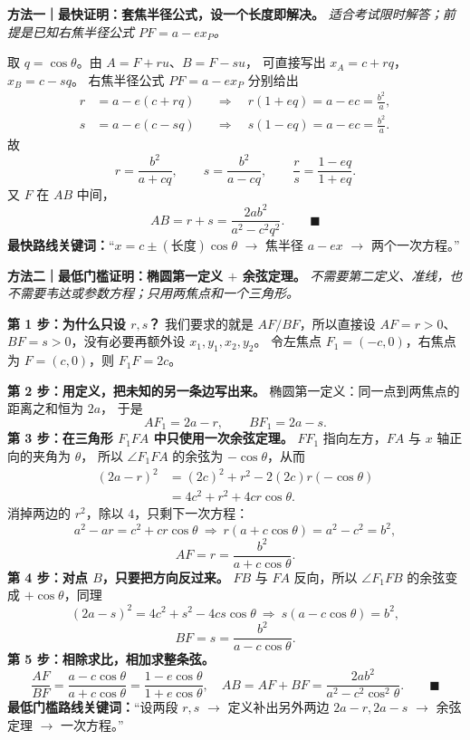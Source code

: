 \begin{proofbox}
\textbf{方法一｜最快证明：套焦半径公式，设一个长度即解决。}\quad
\emph{适合考试限时解答；前提是已知右焦半径公式 $PF=a-ex_P$。}
\par\smallskip\noindent
取 $q=\cos\theta$。由 $A=F+ru$、$B=F-su$，
可直接写出 $x_A=c+rq$，$x_B=c-sq$。
右焦半径公式 $PF=a-ex_P$ 分别给出
\[
 \begin{aligned}
 r&=a-e(c+rq)
 &&\Longrightarrow\quad r(1+eq)=a-ec=\frac{b^2}{a},\\
 s&=a-e(c-sq)
 &&\Longrightarrow\quad s(1-eq)=a-ec=\frac{b^2}{a}.
 \end{aligned}
\]
故\vspace{-5pt}
\[
 \boxed{r=\frac{b^2}{a+cq},\qquad
 s=\frac{b^2}{a-cq}},\qquad
 \boxed{\frac rs=\frac{1-eq}{1+eq}}.
\]
又 $F$ 在 $AB$ 中间，
\[
 \boxed{AB=r+s=\frac{2ab^2}{a^2-c^2q^2}}.\qquad\blacksquare
\]
\textbf{最快路线关键词：}``$x=c\pm(\text{长度})\cos\theta$
$\to$ 焦半径 $a-ex$ $\to$ 两个一次方程。''
\end{proofbox}

\begin{proofbox}
\textbf{方法二｜最低门槛证明：椭圆第一定义 $+$ 余弦定理。}\quad
\emph{不需要第二定义、准线，也不需要韦达或参数方程；只用两焦点和一个三角形。}
\par\smallskip\noindent
\textbf{第 1 步：为什么只设 $r,s$？}
我们要求的就是 $AF/BF$，所以直接设
$AF=r>0$、$BF=s>0$，没有必要再额外设 $x_1,y_1,x_2,y_2$。
令左焦点 $F_1=(-c,0)$，右焦点为 $F=(c,0)$，则
$F_1F=2c$。
\par\smallskip\noindent
\textbf{第 2 步：用定义，把未知的另一条边写出来。}
椭圆第一定义：同一点到两焦点的距离之和恒为 $2a$，
于是
\[
 AF_1=2a-r,\qquad BF_1=2a-s.
\]
\textbf{第 3 步：在三角形 $F_1FA$ 中只使用一次余弦定理。}
$FF_1$ 指向左方，$FA$ 与 $x$ 轴正向的夹角为 $\theta$，
所以 $\angle F_1FA$ 的余弦为 $-\cos\theta$，从而
\[
 \begin{aligned}
 (2a-r)^2
 &= (2c)^2+r^2-2(2c)r(-\cos\theta)\\
 &=4c^2+r^2+4cr\cos\theta.
 \end{aligned}
\]
消掉两边的 $r^2$，除以 $4$，只剩下一次方程：
\[
 a^2-ar=c^2+cr\cos\theta
 \ \Longrightarrow\ r(a+c\cos\theta)=a^2-c^2=b^2,
\]
\[
 \boxed{AF=r=\frac{b^2}{a+c\cos\theta}}.
\]
\textbf{第 4 步：对点 $B$，只要把方向反过来。}
$FB$ 与 $FA$ 反向，所以 $\angle F_1FB$ 的余弦变成
$+\cos\theta$，同理
\[
 (2a-s)^2=4c^2+s^2-4cs\cos\theta
 \ \Longrightarrow\ s(a-c\cos\theta)=b^2,
\]
\[
 \boxed{BF=s=\frac{b^2}{a-c\cos\theta}}.
\]
\textbf{第 5 步：相除求比，相加求整条弦。}
\[
 \frac{AF}{BF}=\frac{a-c\cos\theta}{a+c\cos\theta}
 =\frac{1-e\cos\theta}{1+e\cos\theta},
\quad AB=AF+BF=\frac{2ab^2}{a^2-c^2\cos^2\theta}.
\qquad\blacksquare
\]
\textbf{最低门槛路线关键词：}``设两段 $r,s$ $\to$
定义补出另外两边 $2a-r,2a-s$ $\to$ 余弦定理 $\to$ 一次方程。''
\end{proofbox}

